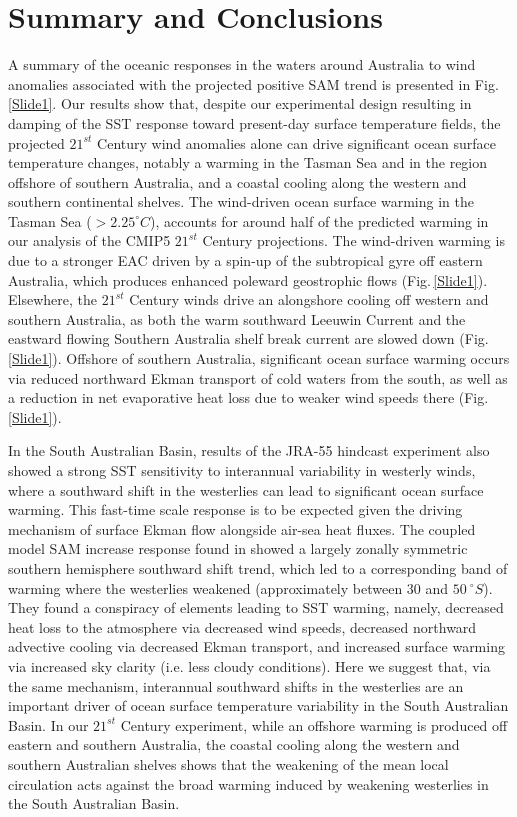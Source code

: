 \documentclass[draft,linenumbers]{agujournal2018}
\begin{document}
\section{Summary and Conclusions}
A summary of the oceanic responses in the waters around Australia to wind anomalies associated with the projected positive SAM trend is presented in Fig.\,\ref{Slide1}. Our results show that, despite our experimental design resulting in damping of the SST response toward present-day surface temperature fields, the projected $21^{st}$ Century wind anomalies alone can drive significant ocean surface temperature changes, notably a warming in the Tasman Sea and in the region offshore of southern Australia, and a coastal cooling along the western and southern continental shelves. The wind-driven ocean surface warming in the Tasman Sea ($> 2.25 ^{\circ}C$), accounts for around half of the predicted warming in our analysis of the CMIP5 $21^{st}$ Century projections. The wind-driven warming is due to a stronger EAC driven by a spin-up of the subtropical gyre off eastern Australia, which produces enhanced poleward geostrophic flows (Fig.\,\ref{Slide1}). Elsewhere, the $21^{st}$ Century winds drive an alongshore cooling off western and southern Australia, as both the warm southward Leeuwin Current and the eastward flowing Southern Australia shelf break current are slowed down (Fig.\,\ref{Slide1}). Offshore of southern Australia, significant ocean surface warming occurs via reduced northward Ekman transport of cold waters from the south, as well as a reduction in net evaporative heat loss due to weaker wind speeds there (Fig.\,\ref{Slide1}).

In the South Australian Basin, results of the JRA-55 hindcast experiment also showed a strong SST sensitivity to interannual variability in westerly winds, where a southward shift in the westerlies can lead to significant ocean surface warming. This fast-time scale response is to be expected given the driving mechanism of surface Ekman flow alongside air-sea heat fluxes. The coupled model SAM increase response found in \citet{SenGupta2006} showed a largely zonally symmetric southern hemisphere southward shift trend, which led to a corresponding band of warming where the westerlies weakened (approximately between $30$ and $50\ ^{\circ}S$). They found a conspiracy of elements leading to SST warming, namely, decreased heat loss to the atmosphere via decreased wind speeds, decreased northward advective cooling via decreased Ekman transport, and increased surface warming via increased sky clarity (i.e. less cloudy conditions). Here we suggest that, via the same mechanism, interannual southward shifts in the westerlies are an important driver of ocean surface temperature variability in the South Australian Basin. In our $21^{st}$ Century experiment, while an offshore warming is produced off eastern and southern Australia, the coastal cooling along the western and southern Australian shelves shows that the weakening of the mean local circulation acts against the broad warming induced by weakening westerlies in the South Australian Basin.
\end{document}
